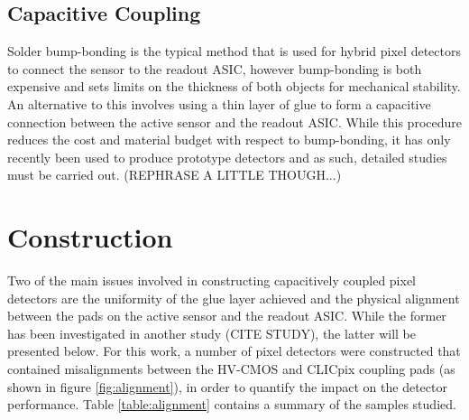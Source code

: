 \subsection{Capacitive Coupling}

Solder bump-bonding is the typical method that is used for hybrid pixel detectors to connect the sensor to the readout ASIC, however bump-bonding is both expensive and sets limits on the thickness of both objects for mechanical stability.  An alternative to this involves using a thin layer of glue to form a capacitive connection between the active sensor and the readout ASIC.  While this procedure reduces the cost and material budget with respect to bump-bonding, it has only recently been used to produce prototype detectors and as such, detailed studies must be carried out. (REPHRASE A LITTLE THOUGH...)


\section{Construction}

Two of the main issues involved in constructing capacitively coupled pixel detectors are the uniformity of the glue layer achieved and the physical alignment between the pads on the active sensor and the readout ASIC. While the former has been investigated in another study (CITE STUDY), the latter will be presented below. For this work, a number of pixel detectors were constructed that contained misalignments between the HV-CMOS and CLICpix coupling pads (as shown in figure \ref{fig:alignment}), in order to quantify the impact on the detector performance. Table \ref{table:alignment} contains a summary of the samples studied.

